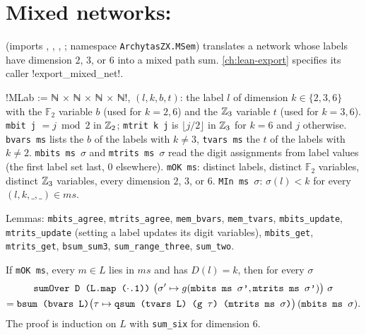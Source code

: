\section{Mixed networks: \texorpdfstring{}{PathSumMixedNet}}\label{sec:lean-pathsum-mixednet}

 (imports , , ,
; namespace \textnormal{\texttt{ArchytasZX.MSem}}) translates a network whose labels have
dimension $2$, $3$, or $6$ into a mixed path sum. \cref{ch:lean-export} specifies its caller
\lean!export_mixed_net!.

\begin{definition}\label{def:lean-pathsum-mlab}
\lean!MLab := ℕ × ℕ × ℕ × ℕ!, $(l,k,b,t)$: the label $l$ of dimension $k\in\{2,3,6\}$ with the
$\mathbb F_2$ variable $b$ (used for $k=2,6$) and the $\mathbb{Z}_{3}$ variable $t$ (used for $k=3,6$).
\textnormal{\texttt{mbit j}} $= j\bmod 2$ in $\mathbb{Z}_{2}$; \textnormal{\texttt{mtrit k j}} is $\lfloor j/2\rfloor$ in $\mathbb{Z}_{3}$ for $k=6$ and $j$
otherwise. \textnormal{\texttt{bvars ms}} lists the $b$ of the labels with $k\ne3$, \textnormal{\texttt{tvars ms}} the $t$ of the
labels with $k\ne2$. \textnormal{\texttt{mbits ms \ensuremath{\sigma}}} and \textnormal{\texttt{mtrits ms \ensuremath{\sigma}}} read the digit assignments from
label values (the first label set last, $0$ elsewhere). \textnormal{\texttt{mOK ms}}: distinct labels, distinct
$\mathbb F_2$ variables, distinct $\mathbb{Z}_{3}$ variables, every dimension $2$, $3$, or $6$.
\textnormal{\texttt{MIn ms \ensuremath{\sigma}}}: $\sigma(l)<k$ for every $(l,k,\_,\_)\in ms$.
\end{definition}
\noindent Lemmas: \textnormal{\texttt{mbits\_agree}}, \textnormal{\texttt{mtrits\_agree}}, \textnormal{\texttt{mem\_bvars}}, \textnormal{\texttt{mem\_tvars}},
\textnormal{\texttt{mbits\_update}}, \textnormal{\texttt{mtrits\_update}} (setting a label updates its digit variables),
\textnormal{\texttt{mbits\_get}}, \textnormal{\texttt{mtrits\_get}}, \textnormal{\texttt{bsum\_sum3}}, \textnormal{\texttt{sum\_range\_three}}, \textnormal{\texttt{sum\_two}}.

\begin{theorem}
If \textnormal{\texttt{mOK ms}}, every $m\in L$ lies in $ms$ and has $D(l)=k$, then for every $\sigma$
\begin{multline*}
\textnormal{\texttt{sumOver D (L.map (\ensuremath{\cdot}.1))}}\ \bigl(\sigma'\mapsto g(\textnormal{\texttt{mbits ms \ensuremath{\sigma}'}},\textnormal{\texttt{mtrits ms \ensuremath{\sigma}'}})\bigr)\ \sigma\\
 = \textnormal{\texttt{bsum (bvars L)}}\bigl(\tau\mapsto\textnormal{\texttt{qsum (tvars L) (g \ensuremath{\tau}) (mtrits ms \ensuremath{\sigma})}}\bigr)\,(\textnormal{\texttt{mbits ms \ensuremath{\sigma}}}).
\end{multline*}
The proof is induction on $L$ with \textnormal{\texttt{sum\_six}} for dimension $6$.
\end{theorem}

